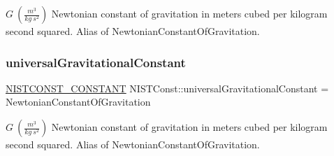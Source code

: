 $G \ (\frac{m^3}{kg\ s^2})$ Newtonian constant of gravitation in meters cubed per kilogram second squared. Alias of Newtonian\+Constant\+Of\+Gravitation. \mbox{\label{group___n_i_s_t_const-_gravitational_constant_gafc4a1b84021bd81d225eead906164721}} 
\subsubsection{\texorpdfstring{universal\+Gravitational\+Constant}{universalGravitationalConstant}}
{\footnotesize\ttfamily \mbox{\hyperlink{group___n_i_s_t_const-_macros_ga2b0fc1d7452373f816175dd86ce26729}{N\+I\+S\+T\+C\+O\+N\+S\+T\+\_\+\+C\+O\+N\+S\+T\+A\+NT}} N\+I\+S\+T\+Const\+::universal\+Gravitational\+Constant = Newtonian\+Constant\+Of\+Gravitation}

$G \ (\frac{m^3}{kg\ s^2})$ Newtonian constant of gravitation in meters cubed per kilogram second squared. Alias of Newtonian\+Constant\+Of\+Gravitation. 